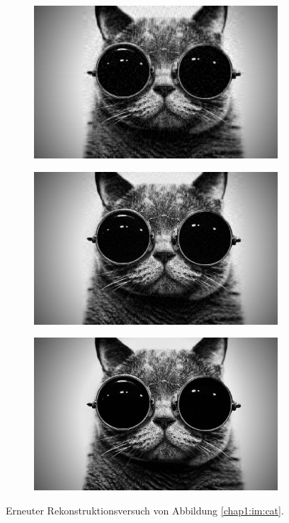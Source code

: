 \begin{figure}[h!]
\vspace{0.4cm}
\begin{subfigure}[c]{.3\textwidth}
\includegraphics[width=.9\linewidth]{images/Cat50}
\end{subfigure}
\begin{subfigure}[c]{.3\textwidth}
\includegraphics[width=.9\linewidth]{images/Cat100}
\label{im:chap1:subE}
\end{subfigure}
\begin{subfigure}[c]{.3\textwidth}
\includegraphics[width=.9\linewidth]{images/Cat300}
\label{im:chap1:subF}
\end{subfigure}

\caption{Erneuter Rekonstruktionsversuch von Abbildung \ref{chap1:im:cat}.}
\end{figure}

